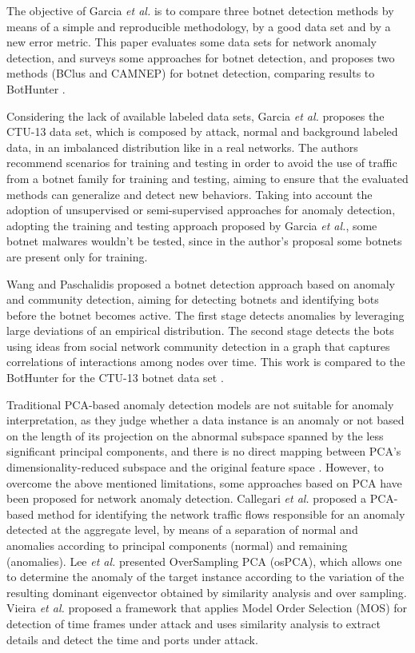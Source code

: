 The objective of Garcia \emph{et al.} \cite{garcia2014empirical} is to compare three botnet detection methods by means of a simple and reproducible methodology, by a good data set and by a new error metric. This paper evaluates some data sets for network anomaly detection, and surveys some approaches for botnet detection, and proposes two methods (BClus and CAMNEP) for botnet detection, comparing results to BotHunter \cite{gu2007bothunter}.

Considering the lack of available labeled data sets, Garcia \emph{et al.} \cite{garcia2014empirical} proposes the CTU-13 data set, which is composed by attack, normal and background labeled data, in an imbalanced distribution like in a real networks. The authors recommend scenarios for training and testing in order to avoid the use of traffic from a botnet family for training and testing, aiming to ensure that the evaluated methods can generalize and detect new behaviors. Taking into account the adoption of unsupervised or semi-supervised approaches for anomaly detection, adopting the training and testing approach proposed by Garcia \emph{et al.}, some botnet malwares wouldn't be tested, since in the author's proposal some botnets are present only for training.

Wang and Paschalidis \cite{wang2017botnet} proposed a botnet detection approach based on anomaly and community detection, aiming for detecting botnets and identifying bots before the botnet becomes active. The first stage detects anomalies by leveraging large deviations of an empirical distribution. The second stage detects the bots using ideas from social network community detection in a graph that captures correlations of interactions among nodes over time. This work is compared to the BotHunter \cite{gu2007bothunter} for the CTU-13 botnet data set \cite{garcia2014empirical}.

Traditional PCA-based anomaly detection models are not suitable for anomaly interpretation, as they judge whether a data instance is an anomaly or not based on the length of its projection on the abnormal subspace spanned by the less significant principal components, and there is no direct mapping between PCA’s dimensionality-reduced subspace and the original feature space \cite{ringberg2007sensitivity}. However, to overcome the above mentioned limitations, some approaches based on PCA have been proposed for network anomaly detection. Callegari \emph{et al.} \cite{callegari2011novel} proposed a PCA-based method for identifying the network traffic flows responsible for an anomaly detected at the aggregate level, by means of a separation of normal and anomalies according to principal components (normal) and remaining (anomalies). Lee \emph{et al.} \cite{Lee2013} presented OverSampling PCA (osPCA), which allows one to determine the anomaly of the target instance according to the variation of the resulting dominant eigenvector obtained by similarity analysis and over sampling. Vieira \emph{et al.} \cite{vieira2017model} proposed a framework that applies Model Order Selection (MOS) for detection of time frames under attack and uses similarity analysis to extract details and detect the time and ports under attack.

